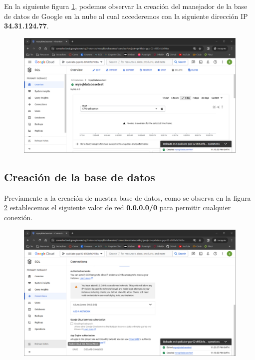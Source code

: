 \documentclass[12pt,a4paper]{article}
\begin{document}
En la siguiente figura \ref{fig:2_1_2_Google_DBMS}, podemos observar la creación del manejador de la base de datos de Google en la nube al cual accederemos con la siguiente dirección IP \textbf{34.31.124.77}.

\begin{figure}[H]
    \centering
    \includegraphics[width=.8\linewidth]{M4_Servicios_Cómputo_en_la_Nube/Tarea_6_Creación_sistema_administración_Base_de_Datos/reporte/figuras/2_1_2_Google_DBMS.png}
    \label{fig:2_1_2_Google_DBMS}
\end{figure}

\vspace{10em}

\subsection{Creación de la base de datos}

Previamente a la creación de nuestra base de datos, como se observa en la figura \ref{fig:2_2_1_Google_DBMS} establecemos el siguiente valor de red \textbf{0.0.0.0/0} para permitir cualquier conexión.

\begin{figure}[H]
    \centering
    \includegraphics[width=.7\linewidth]{M4_Servicios_Cómputo_en_la_Nube/Tarea_6_Creación_sistema_administración_Base_de_Datos/reporte/figuras/2_2_1_Google_DBMS.png}
    \label{fig:2_2_1_Google_DBMS}
\end{figure}
\end{document}
